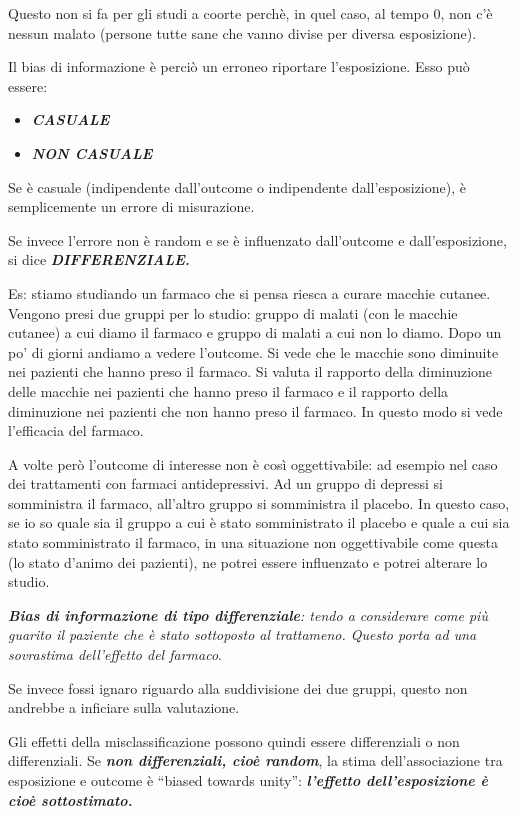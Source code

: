 Questo non si fa per gli studi a coorte perchè, in quel caso, al tempo
0, non c'è nessun malato (persone tutte sane che vanno divise per
diversa esposizione).

Il bias di informazione è perciò un erroneo riportare l'esposizione.
Esso può essere:

\begin{itemize}
\item
  \textbf{\emph{CASUALE}}
\item
  \textbf{\emph{NON CASUALE}}
\end{itemize}

Se è casuale (indipendente dall'outcome o indipendente
dall'esposizione), è semplicemente un errore di misurazione.

Se invece l'errore non è random e se è influenzato dall'outcome e
dall'esposizione, si dice \textbf{\emph{DIFFERENZIALE.}}

Es: stiamo studiando un farmaco che si pensa riesca a curare macchie
cutanee. Vengono presi due gruppi per lo studio: gruppo di malati (con
le macchie cutanee) a cui diamo il farmaco e gruppo di malati a cui non
lo diamo. Dopo un po' di giorni andiamo a vedere l'outcome. Si vede che
le macchie sono diminuite nei pazienti che hanno preso il farmaco. Si
valuta il rapporto della diminuzione delle macchie nei pazienti che
hanno preso il farmaco e il rapporto della diminuzione nei pazienti che
non hanno preso il farmaco. In questo modo si vede l'efficacia del
farmaco.

A volte però l'outcome di interesse non è così oggettivabile: ad esempio
nel caso dei trattamenti con farmaci antidepressivi. Ad un gruppo di
depressi si somministra il farmaco, all'altro gruppo si somministra il
placebo. In questo caso, se io so quale sia il gruppo a cui è stato
somministrato il placebo e quale a cui sia stato somministrato il
farmaco, in una situazione non oggettivabile come questa (lo stato
d'animo dei pazienti), ne potrei essere influenzato e potrei alterare lo
studio.

\emph{\textbf{Bias di informazione di tipo differenziale}: tendo a
considerare come più guarito il paziente che è stato sottoposto al
trattameno. Questo porta ad una sovrastima dell'effetto del farmaco}.

Se invece fossi ignaro riguardo alla suddivisione dei due gruppi, questo
non andrebbe a inficiare sulla valutazione.

Gli effetti della misclassificazione possono quindi essere differenziali
o non differenziali. Se \textbf{\emph{non differenziali, cioè random}},
la stima dell'associazione tra esposizione e outcome è ``biased towards
unity'': \textbf{\emph{l'effetto dell'esposizione è cioè sottostimato.}}

